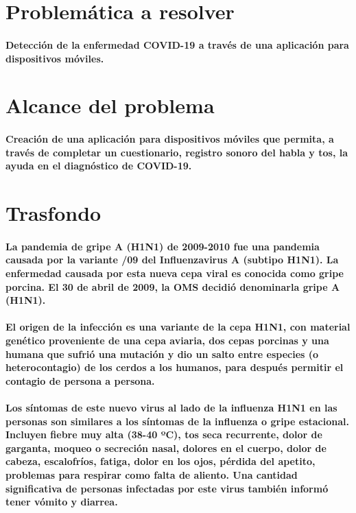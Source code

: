 \documentclass[a4paper,12pt]{article}
\begin{document}
\section{Problemática a resolver}
\paragraph{Detección de la enfermedad COVID-19 a través de una aplicación para dispositivos móviles.}
\section{Alcance del problema}
\paragraph{Creación de una aplicación para dispositivos móviles que permita, a través de completar un  cuestionario, registro sonoro del habla y tos, la ayuda en el diagnóstico de COVID-19.}
\section{Trasfondo}
\paragraph{La pandemia de gripe A (H1N1) de 2009-2010 fue una pandemia causada por la variante /09 del Influenzavirus A (subtipo H1N1). La enfermedad causada por esta nueva cepa viral es conocida como gripe porcina. El 30 de abril de 2009, la OMS decidió denominarla gripe A (H1N1).}
\paragraph{El origen de la infección es una variante de la cepa H1N1, con material genético proveniente de una cepa aviaria, dos cepas porcinas y una humana que sufrió una mutación y dio un salto entre especies (o heterocontagio) de los cerdos a los humanos, para después permitir el contagio de persona a persona.}
\paragraph{Los síntomas de este nuevo virus al lado de la influenza H1N1 en las personas son similares a los síntomas de la influenza o gripe estacional. Incluyen fiebre muy alta (38-40 ºC), tos seca recurrente, dolor de garganta, moqueo o secreción nasal, dolores en el cuerpo, dolor de cabeza, escalofríos, fatiga, dolor en los ojos, pérdida del apetito, problemas para respirar como falta de aliento. Una cantidad significativa de personas infectadas por este virus también informó tener vómito y diarrea.}
\end{document}
